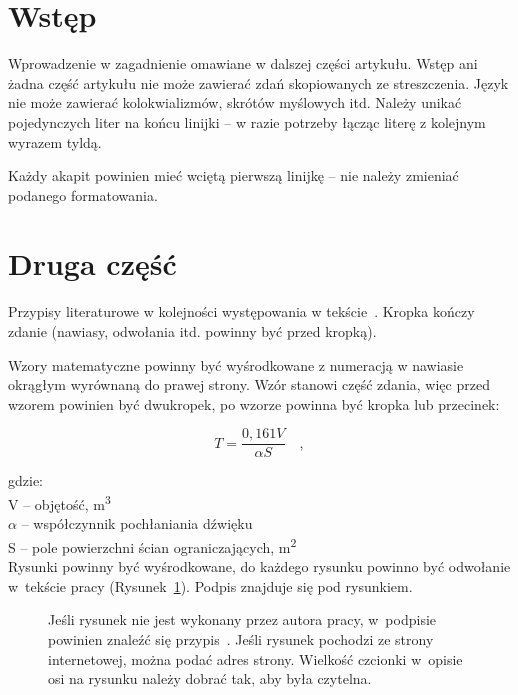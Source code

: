 \documentclass[12pt]{oska}
\affiliation{Afiliacja uczelni}
\begin{document}
\maketitles

\section{Wstęp}

Wprowadzenie w zagadnienie omawiane w dalszej części artykułu. Wstęp ani żadna część artykułu nie może zawierać zdań skopiowanych ze streszczenia. Język nie może zawierać kolokwializmów, skrótów myślowych itd. Należy unikać pojedynczych liter na końcu linijki -- w razie potrzeby łącząc literę z kolejnym wyrazem tyldą.

Każdy akapit powinien mieć wciętą pierwszą linijkę -- nie należy zmieniać podanego formatowania.

\section{Druga część}

Przypisy literaturowe w kolejności występowania w tekście~\cite{bib1}. Kropka kończy zdanie (nawiasy, odwołania itd. powinny być przed kropką).

Wzory matematyczne powinny być wyśrodkowane z numeracją w nawiasie okrągłym wyrównaną do prawej strony. Wzór stanowi część zdania, więc przed wzorem powinien być dwukropek, po wzorze powinna być kropka lub przecinek:

\begin{equation}
	T = \frac{0,161 V}{\alpha S} \quad, \label{wzor1}
\end{equation}


\noindent gdzie:\\
V -- objętość, \si{\meter\cubed}\\
$\alpha$ -- współczynnik pochłaniania dźwięku\\
S -- pole powierzchni ścian ograniczających, \si{\meter\squared}\\

Rysunki powinny być wyśrodkowane, do każdego rysunku powinno być odwołanie w~tekście pracy (Rysunek~\ref{rys1}). Podpis znajduje się pod rysunkiem.

\begin{figure}[H]
	\centering
	\caption{Jeśli rysunek nie jest wykonany przez autora pracy, w~podpisie powinien znaleźć się przypis~\cite{bib2}. Jeśli rysunek pochodzi ze strony internetowej, można podać adres strony. Wielkość czcionki w~opisie osi na rysunku należy dobrać tak, aby była czytelna.}
	\label{rys1}
\end{figure}
\end{document}
